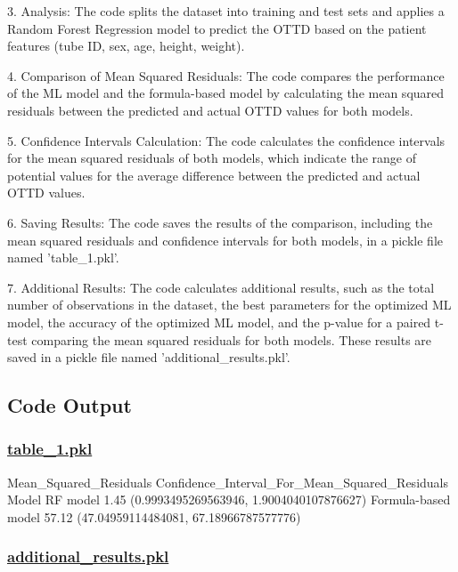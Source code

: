 \documentclass[11pt]{article}
\begin{document}
3. Analysis:
The code splits the dataset into training and test sets and applies a Random Forest Regression model to predict the OTTD based on the patient features (tube ID, sex, age, height, weight).

4. Comparison of Mean Squared Residuals:
The code compares the performance of the ML model and the formula-based model by calculating the mean squared residuals between the predicted and actual OTTD values for both models.

5. Confidence Intervals Calculation:
The code calculates the confidence intervals for the mean squared residuals of both models, which indicate the range of potential values for the average difference between the predicted and actual OTTD values.

6. Saving Results:
The code saves the results of the comparison, including the mean squared residuals and confidence intervals for both models, in a pickle file named 'table\_1.pkl'.

7. Additional Results:
The code calculates additional results, such as the total number of observations in the dataset, the best parameters for the optimized ML model, the accuracy of the optimized ML model, and the p-value for a paired t-test comparing the mean squared residuals for both models. These results are saved in a pickle file named 'additional\_results.pkl'.

\subsection{Code Output}\hypertarget{file-table-1-pkl}{}

\subsubsection*{\hyperlink{code-Data Analysis-table-1-pkl}{table\_1.pkl}}

\begin{codeoutput}
                     Mean_Squared_Residuals Confidence_Interval_For_Mean_Squared_Residuals
Model                                                                                     
RF model                               1.45       (0.9993495269563946, 1.9004040107876627)
Formula-based model                   57.12         (47.04959114484081, 67.18966787577776)
\end{codeoutput}\hypertarget{file-additional-results-pkl}{}

\subsubsection*{\hyperlink{code-Data Analysis-additional-results-pkl}{additional\_results.pkl}}
\end{document}
